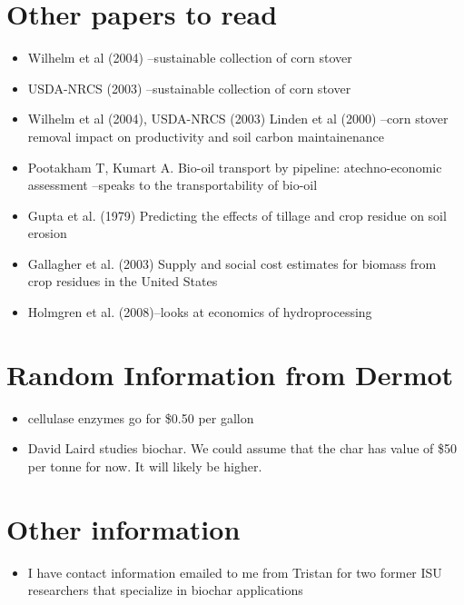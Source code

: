 \documentclass{article}\usepackage[]{graphicx}\usepackage[]{color}
\begin{document}
\section{Other papers to read}
\begin{itemize}
\item Wilhelm et al (2004) --sustainable collection of corn stover
\item USDA-NRCS (2003) --sustainable collection of corn stover
\item Wilhelm et al (2004), USDA-NRCS (2003) Linden et al (2000) --corn stover removal impact on productivity and soil carbon maintainenance
\item Pootakham T, Kumart A.  Bio-oil transport by pipeline: atechno-economic assessment --speaks to the transportability of bio-oil
\item Gupta et al. (1979) Predicting the effects of tillage and crop residue on soil erosion
\item Gallagher et al. (2003) Supply and social cost estimates for biomass from crop residues in the United States
\item Holmgren et al. (2008)--looks at economics of hydroprocessing
\end{itemize}

\section{Random Information from Dermot}
\begin{itemize}
\item cellulase enzymes go for \$0.50 per gallon
\item David Laird studies biochar.  We could assume that the char has value of \$50 per tonne for now.  It will likely be higher.
\end{itemize}

\section{Other information}
\begin{itemize}
\item I have contact information emailed to me from Tristan for two former ISU researchers that specialize in biochar applications
\end{itemize}
\end{document}
